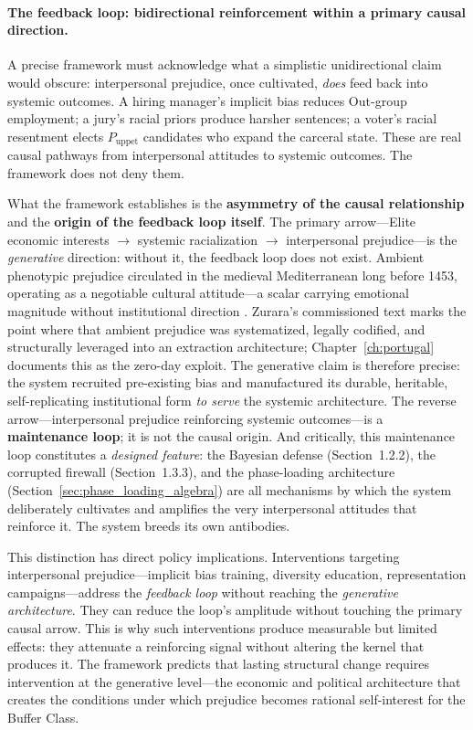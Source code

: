 \paragraph{The feedback loop: bidirectional reinforcement within a primary causal direction.}
A precise framework must acknowledge what a simplistic unidirectional claim would obscure: interpersonal prejudice, once cultivated, \textit{does} feed back into systemic outcomes. A hiring manager's implicit bias reduces Out-group employment; a jury's racial priors produce harsher sentences; a voter's racial resentment elects $P_{\text{uppet}}$ candidates who expand the carceral state. These are real causal pathways from interpersonal attitudes to systemic outcomes. The framework does not deny them.

What the framework establishes is the \textbf{asymmetry of the causal relationship} and the \textbf{origin of the feedback loop itself}. The primary arrow---Elite economic interests $\rightarrow$ systemic racialization $\rightarrow$ interpersonal prejudice---is the \textit{generative} direction: without it, the feedback loop does not exist. Ambient phenotypic prejudice circulated in the medieval Mediterranean long before 1453, operating as a negotiable cultural attitude---a scalar carrying emotional magnitude without institutional direction \cite{sweet_iberian_roots_1997,bethencourt_racisms_2013}. Zurara's commissioned text marks the point where that ambient prejudice was systematized, legally codified, and structurally leveraged into an extraction architecture; Chapter~\ref{ch:portugal} documents this as the zero-day exploit. The generative claim is therefore precise: the system recruited pre-existing bias and manufactured its durable, heritable, self-replicating institutional form \textit{to serve} the systemic architecture. The reverse arrow---interpersonal prejudice reinforcing systemic outcomes---is a \textbf{maintenance loop}; it is not the causal origin. And critically, this maintenance loop constitutes a \textit{designed feature}: the Bayesian defense (Section~1.2.2), the corrupted firewall (Section~1.3.3), and the phase-loading architecture (Section~\ref{sec:phase_loading_algebra}) are all mechanisms by which the system deliberately cultivates and amplifies the very interpersonal attitudes that reinforce it. The system breeds its own antibodies.

This distinction has direct policy implications. Interventions targeting interpersonal prejudice---implicit bias training, diversity education, representation campaigns---address the \textit{feedback loop} without reaching the \textit{generative architecture}. They can reduce the loop's amplitude without touching the primary causal arrow. This is why such interventions produce measurable but limited effects: they attenuate a reinforcing signal without altering the kernel that produces it. The framework predicts that lasting structural change requires intervention at the generative level---the economic and political architecture that creates the conditions under which prejudice becomes rational self-interest for the Buffer Class.

